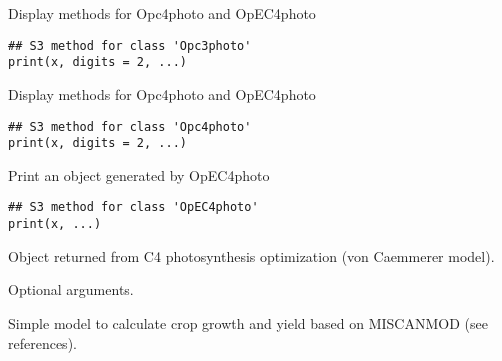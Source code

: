 \documentclass[letterpaper]{book}
\begin{document}
%
\begin{Description}\relax
Display methods for Opc4photo and OpEC4photo
\end{Description}
%
\begin{Usage}
\begin{verbatim}
## S3 method for class 'Opc3photo'
print(x, digits = 2, ...)
\end{verbatim}
\end{Usage}
%
\begin{Description}\relax
Display methods for Opc4photo and OpEC4photo
\end{Description}
%
\begin{Usage}
\begin{verbatim}
## S3 method for class 'Opc4photo'
print(x, digits = 2, ...)
\end{verbatim}
\end{Usage}
%
\begin{Description}\relax
Print an object generated by OpEC4photo
\end{Description}
%
\begin{Usage}
\begin{verbatim}
## S3 method for class 'OpEC4photo'
print(x, ...)
\end{verbatim}
\end{Usage}
%
\begin{Arguments}
\begin{ldescription}
\item[\code{x}] Object returned from C4 photosynthesis
optimization (von Caemmerer model).

\item[\code{...}] Optional arguments.
\end{ldescription}
\end{Arguments}
%
\begin{SeeAlso}\relax
{}
\end{SeeAlso}
%
\begin{Description}\relax
Simple model to calculate crop growth and yield based on
MISCANMOD (see references).
\end{Description}
\end{document}
